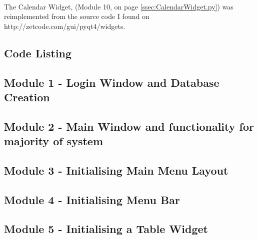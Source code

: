 \

The Calendar Widget, (Module 10, on page \ref{ssec:CalendarWidget.py}) was reimplemented from the source code I found on http://zetcode.com/gui/pyqt4/widgets.
\begin{tiny}
\end{tiny}

\begin{landscape}
\section{Code Listing}
\begin{scriptsize}

\subsection{Module 1 - Login Window and Database Creation} \label{ssec:LoginDB.py}


\subsection{Module 2 - Main Window and functionality for majority of system} \label{ssec:MainMenu.py}


\subsection{Module 3 - Initialising Main Menu Layout}


\subsection{Module 4 - Initialising Menu Bar}


\subsection{Module 5 - Initialising a Table Widget}



\end{scriptsize}
\end{landscape}
